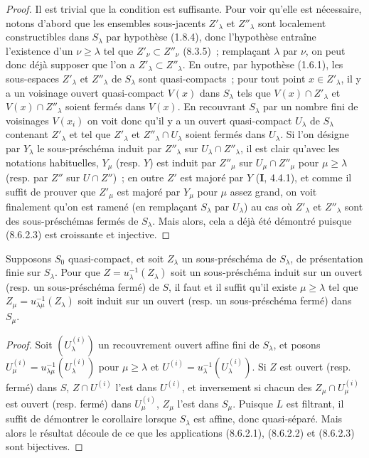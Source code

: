 \begin{proof}
Il est trivial que la condition est suffisante. Pour voir qu'elle est
nécessaire, notons d'abord que les ensembles sous-jacents $Z'_\lambda$ et
$Z''_\lambda$ sont localement constructibles dans $S_\lambda$ par hypothèse
(1.8.4), donc l'hypothèse entraîne l'existence d'un $\nu\geq\lambda$ tel
que $Z'_\nu\subset Z''_\nu$ (8.3.5)~; remplaçant $\lambda$ par $\nu$, on peut
donc déjà supposer que l'on a $Z'_\lambda\subset Z''_\lambda$. En outre, par
hypothèse (1.6.1), les sous-espaces $Z'_\lambda$ et $Z''_\lambda$ de
$S_\lambda$ sont quasi-compacts~; pour tout point $x\in Z'_\lambda$, il y a un
voisinage ouvert quasi-compact $V(x)$ dans $S_\lambda$ tels que
$V(x)\cap Z'_\lambda$ et $V(x)\cap Z''_\lambda$ soient fermés dans $V(x)$. En
recouvrant $S_\lambda$ par un nombre fini de voisinages $V(x_i)$ on voit donc
qu'il y a un ouvert quasi-compact $U_\lambda$ de $S_\lambda$ contenant
$Z'_\lambda$ et tel que $Z'_\lambda$ et $Z''_\lambda\cap U_\lambda$ soient
fermés dans $U_\lambda$. Si l'on désigne par $Y_\lambda$ le sous-préschéma
induit par $Z''_\lambda$ sur $U_\lambda\cap Z''_\lambda$, il est clair qu'avec
les notations habituelles, $Y_\mu$ (resp. $Y$) est induit par $Z''_\mu$ sur
$U_\mu\cap Z''_\mu$ pour $\mu\geq\lambda$ (resp. par $Z''$ sur
$U\cap Z''$)~; en outre $Z'$ est majoré par $Y$ (\textbf{I}, 4.4.1), et comme il suffit
de prouver que $Z'_\mu$ est majoré par $Y_\mu$ pour $\mu$
assez grand, on voit finalement qu'on est ramené (en remplaçant $S_\lambda$
par $U_\lambda$) au cas où $Z'_\lambda$ et $Z''_\lambda$ sont des
sous-préschémas fermés de $S_\lambda$. Mais alors, cela a déjà été démontré
puisque (8.6.2.3) est croissante et injective.
\end{proof}

\begin{corollary}[8.6.4]
\label{IV.8.6.4-fr}
Supposons $S_0$ quasi-compact, et soit $Z_\lambda$ un sous-préschéma de
$S_\lambda$, de présentation finie sur $S_\lambda$. Pour que
$Z=u_\lambda^{-1}(Z_\lambda)$ soit un sous-préschéma induit sur un ouvert
\textup{(resp.} un sous-préschéma fermé\textup{)} de $S$, il faut et il suffit qu'il existe
$\mu\geq\lambda$ tel que $Z_\mu=u_{\lambda\mu}^{-1}(Z_\lambda)$ soit induit
sur un ouvert \textup{(resp.} un sous-préschéma fermé\textup{)} dans $S_\mu$.
\end{corollary}

\begin{proof}
Soit $(U_\lambda^{(i)})$ un recouvrement ouvert affine fini de $S_\lambda$, et
posons $U_\mu^{(i)}=u_{\lambda\mu}^{-1}(U_\lambda^{(i)})$ pour
$\mu\geq\lambda$ et $U^{(i)}=u_\lambda^{-1}(U_\lambda^{(i)})$. Si $Z$ est
ouvert (resp. fermé) dans $S$, $Z\cap U^{(i)}$ l'est dans $U^{(i)}$, et
inversement si chacun des $Z_\mu\cap U_\mu^{(i)}$ est ouvert (resp. fermé)
dans $U_\mu^{(i)}$, $Z_\mu$ l'est dans $S_\mu$. Puisque $L$ est filtrant, il
suffit de démontrer le corollaire lorsque $S_\lambda$ est affine, donc
quasi-séparé. Mais alors le résultat découle de ce que les applications
(8.6.2.1), (8.6.2.2) et (8.6.2.3) sont bijectives.
\end{proof}

